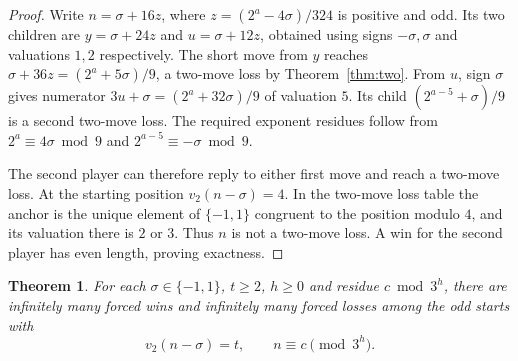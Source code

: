 \documentclass[11pt]{article}
\newtheorem{theorem}{Theorem}
\newcommand{\vTwo}{v_2}
\begin{document}
\begin{proof}
Write \(n=\sigma+16z\), where \(z=(2^a-4\sigma)/324\) is positive and odd. Its two children are \(y=\sigma+24z\) and \(u=\sigma+12z\), obtained using signs \(-\sigma,\sigma\) and valuations \(1,2\) respectively. The short move from \(y\) reaches \(\sigma+36z=(2^a+5\sigma)/9\), a two-move loss by Theorem~\ref{thm:two}. From \(u\), sign \(\sigma\) gives numerator \(3u+\sigma=(2^a+32\sigma)/9\) of valuation \(5\). Its child \((2^{a-5}+\sigma)/9\) is a second two-move loss. The required exponent residues follow from \(2^a\equiv4\sigma\bmod9\) and \(2^{a-5}\equiv-\sigma\bmod9\).

The second player can therefore reply to either first move and reach a two-move loss. At the starting position \(\vTwo(n-\sigma)=4\). In the two-move loss table the anchor is the unique element of \(\{-1,1\}\) congruent to the position modulo \(4\), and its valuation there is \(2\) or \(3\). Thus \(n\) is not a two-move loss. A win for the second player has even length, proving exactness.
\end{proof}

\begin{theorem}\label{thm:mixed}
For each \(\sigma\in\{-1,1\}\), \(t\ge2\), \(h\ge0\) and residue \(c\bmod3^h\), there are infinitely many forced wins and infinitely many forced losses among the odd starts with
\[
 \vTwo(n-\sigma)=t,\qquad n\equiv c\pmod{3^h}.
\]
\end{theorem}
\end{document}
